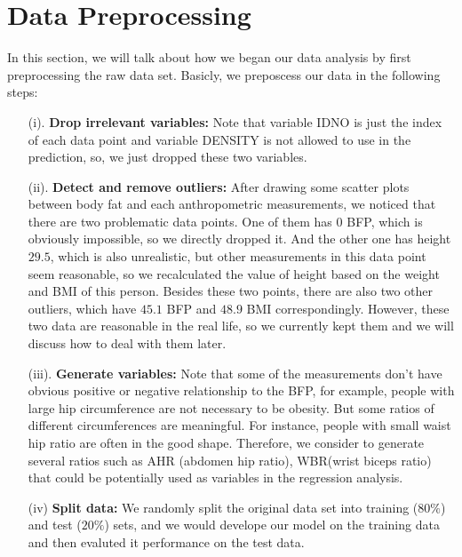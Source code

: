 \documentclass[letterpaper,10pt]{article}
\begin{document}
\section{Data Preprocessing}
In this section, we will talk about how we began our data analysis by first preprocessing the raw data set. Basicly, we preposcess our data in the following steps:
\begin{itemize}
\item[(i).] \textbf{Drop irrelevant variables:} Note that variable IDNO is just the index of each data point and variable DENSITY is not allowed to use in the prediction, so, we just dropped these two variables.
\item[(ii).] \textbf{Detect and remove outliers:} After drawing some scatter plots between body fat and each anthropometric measurements, we noticed that there are two problematic data points. One of them has $0$ BFP, which is obviously impossible, so we directly dropped it. And the other one has  height $29.5$, which is also unrealistic, but other measurements in this data point seem reasonable, so we recalculated the value of height based on the weight and BMI of this person. Besides these two points, there are also two other outliers, which have $45.1$ BFP and $48.9$ BMI correspondingly. However, these two data are reasonable in the real life, so we currently kept them and we will discuss how to deal with them later.
\item[(iii).] \textbf{Generate variables:} Note that some of the measurements don't have obvious positive or negative relationship to the BFP, for example, people with large hip circumference are not necessary to be obesity. But some ratios of different circumferences are meaningful. For instance, people with small waist hip ratio are often in the good shape. Therefore, we consider to generate several ratios such as AHR (abdomen hip ratio), WBR(wrist biceps ratio) that could be potentially used as variables in the regression analysis.
\item[(iv)] \textbf{Split data:} We randomly split the original data set into training ($80\%$) and test ($20\%$) sets, and we would develope our model on the training data and then evaluted it performance on the test data.
\end{itemize}
\end{document}
